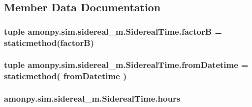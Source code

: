 \subsection{Member Data Documentation}
\hypertarget{classamonpy_1_1sim_1_1sidereal__m_1_1_sidereal_time_a9cb51d82ce9357d359e3e268bfed26b9}{
\subsubsection[{factor\-B}]{\setlength{\rightskip}{0pt plus 5cm}tuple amonpy.\-sim.\-sidereal\-\_\-m.\-Sidereal\-Time.\-factor\-B = staticmethod(factor\-B)\hspace{0.3cm}{\ttfamily [static]}}}\label{classamonpy_1_1sim_1_1sidereal__m_1_1_sidereal_time_a9cb51d82ce9357d359e3e268bfed26b9}
\hypertarget{classamonpy_1_1sim_1_1sidereal__m_1_1_sidereal_time_ac219c4126842ace610dd119ee3ef8996}{
\subsubsection[{from\-Datetime}]{\setlength{\rightskip}{0pt plus 5cm}tuple amonpy.\-sim.\-sidereal\-\_\-m.\-Sidereal\-Time.\-from\-Datetime = staticmethod( from\-Datetime )\hspace{0.3cm}{\ttfamily [static]}}}\label{classamonpy_1_1sim_1_1sidereal__m_1_1_sidereal_time_ac219c4126842ace610dd119ee3ef8996}
\hypertarget{classamonpy_1_1sim_1_1sidereal__m_1_1_sidereal_time_acba5be2a2c0a308b30ea3f58109c40d7}{
\subsubsection[{hours}]{\setlength{\rightskip}{0pt plus 5cm}amonpy.\-sim.\-sidereal\-\_\-m.\-Sidereal\-Time.\-hours}}\label{classamonpy_1_1sim_1_1sidereal__m_1_1_sidereal_time_acba5be2a2c0a308b30ea3f58109c40d7}
